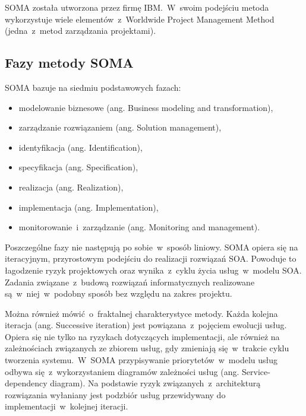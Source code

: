 SOMA została utworzona przez firmę IBM.~W~swoim podejściu metoda wykorzystuje wiele elementów~z~Worldwide Project Management Method (jedna~z~metod zarządzania projektami). \cite{SOMAArsIBMJour}

\subsection{Fazy metody SOMA}
SOMA bazuje na siedmiu podstawowych fazach:
\begin{itemize}
\item{modelowanie biznesowe (ang. Business modeling and transformation),}
\item{zarządzanie rozwiązaniem (ang. Solution management),}
\item{identyfikacja (ang. Identification),}
\item{specyfikacja (ang. Specification),}
\item{realizacja (ang. Realization),}
\item{implementacja (ang. Implementation),}
\item{monitorowanie~i~zarządzanie (ang. Monitoring and management).}
\end{itemize}

Poszczególne fazy nie następują po sobie~w~sposób liniowy. SOMA opiera się na iteracyjnym, przyrostowym podejściu do realizacji rozwiązań SOA. Powoduje to łagodzenie ryzyk projektowych oraz wynika~z~cyklu życia usług~w~modelu SOA. Zadania związane~z~budową rozwiązań informatycznych realizowane są~w~niej~w~podobny sposób bez względu na zakres projektu.

Można również mówić~o~fraktalnej charakterystyce metody. Każda kolejna  iteracja (ang. Successive iteration) jest powiązana~z~pojęciem ewolucji usług. Opiera się nie tylko na ryzykach dotyczących implementacji, ale również na zależnościach związanych ze zbiorem usług, gdy zmieniają się~w~trakcie cyklu tworzenia systemu.~W~SOMA przypisywanie priorytetów~w~modelu usług odbywa się~z~wykorzystaniem diagramów zależności usług (ang. Service-dependency diagram). Na podstawie ryzyk związanych~z~architekturą rozwiązania wyłaniany jest podzbiór usług przewidywany do implementacji~w~kolejnej iteracji.

